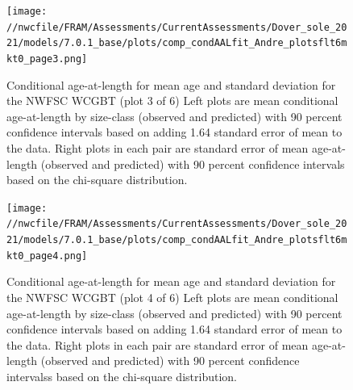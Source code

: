 \documentclass[11pt,
  english,
  a4paper,
]{article}
\begin{document}
\begin{figure}
\centering
\texttt{[image: //nwcfile/FRAM/Assessments/CurrentAssessments/Dover\_sole\_2021/models/7.0.1\_base/plots/comp\_condAALfit\_Andre\_plotsflt6mkt0\_page3.png]}
\caption{Conditional age-at-length for mean age and standard deviation for the NWFSC WCGBT (plot 3 of 6) Left plots are mean conditional age-at-length by size-class (observed and predicted) with 90 percent confidence intervals based on adding 1.64 standard error of mean to the data. Right plots in each pair are standard error of mean age-at-length (observed and predicted) with 90 percent confidence intervals based on the chi-square distribution.\label{fig:wcgbt-caal-fit-3}}
\end{figure}

\tagmcend\tagstructend


\begin{figure}
\centering
\texttt{[image: //nwcfile/FRAM/Assessments/CurrentAssessments/Dover\_sole\_2021/models/7.0.1\_base/plots/comp\_condAALfit\_Andre\_plotsflt6mkt0\_page4.png]}
\caption{Conditional age-at-length for mean age and standard deviation for the NWFSC WCGBT (plot 4 of 6) Left plots are mean conditional age-at-length by size-class (observed and predicted) with 90 percent confidence intervals based on adding 1.64 standard error of mean to the data. Right plots in each pair are standard error of mean age-at-length (observed and predicted) with 90 percent confidence intervalss based on the chi-square distribution.\label{fig:wcgbt-caal-fit-4}}
\end{figure}

\tagmcend\tagstructend

\end{document}
